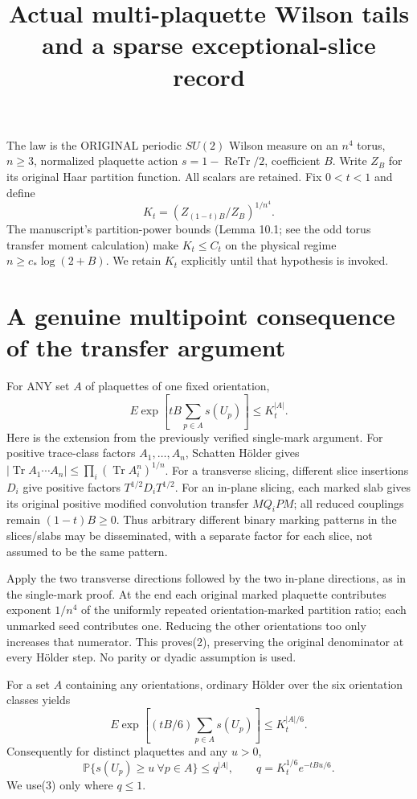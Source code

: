 \documentclass{article}
\title{Actual multi-plaquette Wilson tails and a sparse exceptional-slice record}\author{}\date{}
\begin{document}
\maketitle
The law is the ORIGINAL periodic $SU(2)$ Wilson measure on an $n^4$ torus, $n\ge3$, normalized plaquette action $s=1-\operatorname{ReTr}/2$, coefficient $B$. Write $Z_B$ for its original Haar partition function. All scalars are retained. Fix $0<t<1$ and define
\[
 K_t=\left(Z_{(1-t)B}/Z_B\right)^{1/n^4}.              \tag{1}
\]
The manuscript's partition-power bounds (Lemma 10.1; see the odd torus transfer moment calculation) make $K_t\le C_t$ on the physical regime $n\ge c_*\log(2+B)$. We retain $K_t$ explicitly until that hypothesis is invoked.

\section*{A genuine multipoint consequence of the transfer argument}
For ANY set $A$ of plaquettes of one fixed orientation,
\[
 E\exp[tB\sum_{p\in A}s(U_p)]\le K_t^{|A|}.           \tag{2}
\]
Here is the extension from the previously verified single-mark argument. For positive trace-class factors $A_1,\ldots,A_n$, Schatten H\"older gives
$|\operatorname{Tr}A_1\cdots A_n|\le\prod_i(\operatorname{Tr}A_i^n)^{1/n}$.
For a transverse slicing, different slice insertions $D_i$ give positive factors $T^{1/2}D_iT^{1/2}$. For an in-plane slicing, each marked slab gives its original positive modified convolution transfer $M Q_i P M$; all reduced couplings remain $(1-t)B\ge0$. Thus arbitrary different binary marking patterns in the slices/slabs may be disseminated, with a separate factor for each slice, not assumed to be the same pattern.

Apply the two transverse directions followed by the two in-plane directions, as in the single-mark proof. At the end each original marked plaquette contributes exponent $1/n^4$ of the uniformly repeated orientation-marked partition ratio; each unmarked seed contributes one. Reducing the other orientations too only increases that numerator. This proves(2), preserving the original denominator at every H\"older step. No parity or dyadic assumption is used.

For a set $A$ containing any orientations, ordinary H\"older over the six orientation classes yields
\[
 E\exp[(tB/6)\sum_{p\in A}s(U_p)]\le K_t^{|A|/6}.
\]
Consequently for distinct plaquettes and any $u>0$,
\[
 \mathbb P\{s(U_p)\ge u\ \forall p\in A\}
 \le q^{|A|},\qquad q=K_t^{1/6}e^{-tBu/6}.            \tag{3}
\]
We use(3) only where $q\le1$.
\end{document}
